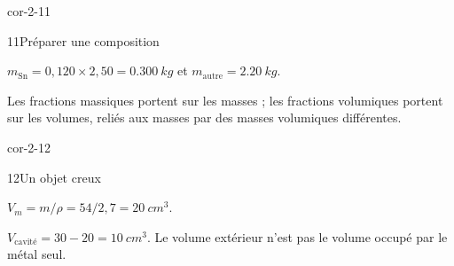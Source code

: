 \begin{blocLivre}{cor-2-11}\begin{corrige}{11}{Préparer une composition}
\begin{questions}
\item $m_{\mathrm{Sn}}=0,120\times2,50=\qty{0,300}{kg}$ et $m_{\mathrm{autre}}=\qty{2,20}{kg}$.
\item Les fractions massiques portent sur les masses ; les fractions volumiques portent sur les volumes, reliés aux masses par des masses volumiques différentes.
\end{questions}
\end{corrige}\end{blocLivre}
\begin{blocLivre}{cor-2-12}\begin{corrige}{12}{Un objet creux}
\begin{questions}
\item $V_m=m/\rho=54/2,7=\qty{20}{cm^3}$.
\item $V_{\mathrm{cavité}}=30-20=\qty{10}{cm^3}$. Le volume extérieur n’est pas le volume occupé par le métal seul.
\end{questions}
\end{corrige}\end{blocLivre}

